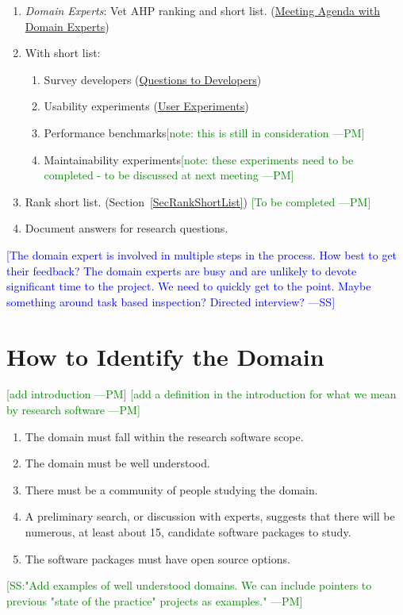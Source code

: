 \documentclass[letterpaper,cleveref]{lipics-v2019}
\newcommand{\authornote}[3]{\textcolor{#1}{[#3 ---#2]}}
\newcommand{\authornote}[3]{}
\newcommand{\wss}[1]{\authornote{blue}{SS}{#1}} %
\newcommand{\pmi}[1]{\authornote{green}{PM}{#1}} %
\theoremstyle{definition}
\begin{document}
\begin{enumerate}
\item \emph{Domain Experts}: Vet AHP ranking and short list. (\href{run:Meeting Agenda with Domain Experts.pdf}{Meeting Agenda with Domain Experts})
\item With short list:
\begin{enumerate}
\item Survey developers (\href{run:Questions to Developers.pdf}{Questions to Developers})
\item Usability experiments (\href{run:User Experiments.pdf}{User Experiments})
\item Performance benchmarks\pmi{note: this is still in consideration}
\item Maintainability experiments\pmi{note: these experiments need to be completed - to be discussed at next meeting}
\end{enumerate}
\item Rank short list. (Section~\ref{SecRankShortList}) \pmi{To be completed}
\item Document answers for research questions.
\end{enumerate}

\wss{The domain expert is involved in multiple steps in the process.  How best
  to get their feedback?  The domain experts are busy and are unlikely to devote
  significant time to the project.  We need to quickly get to the point.  Maybe
  something around task based inspection?  Directed interview?}


\section{How to Identify the Domain} \label{SecIdentifyDomain}
\pmi{add introduction}
\pmi{add a definition in the introduction for what we mean by research software}
\begin{enumerate}	
	\item The domain must fall within the research software scope.
	\item The domain must be well understood.
	\item There must be a community of people studying the domain.
	\item A preliminary search, or discussion with experts, suggests that there will be numerous, at least about 15, candidate software packages to study.
	\item The software packages must have open source options. 
\end{enumerate}
\pmi{SS:"Add examples of well understood domains. We can include pointers to previous "state of the practice" projects as examples."}
\end{document}
